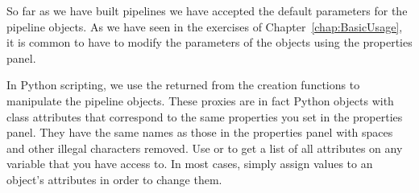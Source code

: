 So far as we have built pipelines we have accepted the default parameters
for the pipeline objects.  As we have seen in the exercises of
Chapter~\ref{chap:BasicUsage}, it is common to have to modify the
parameters of the objects using the properties panel.

In Python scripting, we use the 
returned from the creation functions to manipulate the pipeline objects.
These proxies are in fact Python objects with class attributes that
correspond to the same properties you set in the properties panel.  They
have the same names as those in the properties panel with spaces and other
illegal characters removed.  Use  or
 to get a list of all attributes on any variable
that you have access to.  In most cases, simply assign values to an object's
attributes in order to change them.


